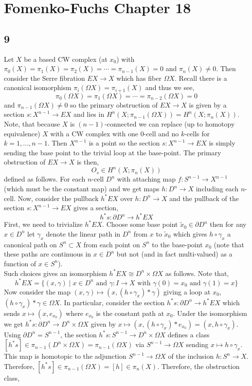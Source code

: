\documentclass[12pt]{extarticle}
\begin{document}

\section{Fomenko-Fuchs Chapter 18}

\subsection{9}

Let $X$ be a based CW complex (at $x_0$) with $\pi_0(X) = \pi_1(X) = \pi_2(X) = \cdots = \pi_{n-1}(X) = 0$ and $\pi_n(X) \neq 0$. Then consider the Serre fibration $E X \to X$ which has fiber $\Omega X$. Recall there is a canonical isomorphism $\pi_{i}(\Omega X) = \pi_{i + 1}(X)$ and thus we see,
\[ \pi_0(\Omega X) = \pi_1(\Omega X) = \cdots = \pi_{n-2}(\Omega X) = 0 \]
and $\pi_{n-1}(\Omega X) \neq 0$ so the primary obstruction of $EX \to X$ is given by a section $s : X^{n-1} \to EX$ and lies in $H^n(X; \pi_{n-1}(\Omega X)) = H^n(X; \pi_n(X))$. Note, that because $X$ is $(n-1)$-connected we can replace (up to homotopy equivalence) $X$ with a CW complex with one $0$-cell and no $k$-cells for $k = 1, \dots, n-1$. Then $X^{n-1}$ is a point so the section $s : X^{n-1} \to EX$ is simply sending the base point to the trivial loop at the base-point. The primary obstruction of $EX \to X$ is then,
\[ O_s \in H^n(X; \pi_n(X)) \]
defined as follows. For each $n$-cell $D^n$ with attaching map $f : S^{n-1} \to X^{n-1}$ (which must be the constant map) and we get maps $h : D^n \to X$ including each $n$-cell. Now, consider the pullback $h^* E X$ over $h : D^n \to X$ and the pullback of the section $s : X^{n-1} \to E X$ gives a section,
\[ h^* s : \partial D^n \to h^* EX \]
First, we need to trivialize $h^* EX$. Choose some base point $\tilde{x}_0 \in \partial D^n$ then for any $x \in D^n$ let $\gamma_x$ denote the linear path in $D^n$ from $x$ to $\tilde{x}_0$ which gives $h \circ \gamma_x$ a canonical path on $S^n \subset X$ from each point on $S^n$ to the base-point $x_0$ (note that these paths are continuous in $x \in D^n$ but not (and in fact multi-valued) as a function of $x \in S^n$).
\bigskip\\
Such choices gives an isomorphism $h^* EX \cong D^n \times \Omega X$ as follows. Note that,
\[ h^* EX = \{ (x, \gamma) \mid x \in D^n \text{ and } \gamma : I \to X \text{ with } \gamma(0) = x_0 \text{ and } \gamma(1) = x \} \]
Now consider the map $(x, \gamma) \mapsto (x, (h \circ \gamma_x) * \gamma)$ giving a loop at $x_0$, $(h \circ \gamma_x) * \gamma \in \Omega X$. In particular, consider the section $h^* s : \partial D^n \to h^* E X$ which sends $x \mapsto (x, e_{x_0})$ where $e_{x_0}$ is the constant path at $x_0$. Under the isomorphism we get $h^* s : \partial D^n \to D^n \times \Omega X$ given by $x \mapsto (x, (h \circ \gamma_x) * e_{x_0}) = (x, h \circ \gamma_x)$. Using $\partial D^n = S^{n-1}$, the section $h^* s : S^{n-1} \to D^n \times \Omega X$ defines a class $[h^* s] \in \pi_{n-1}(D^n \times \Omega X) = \pi_{n-1}(\Omega X)$ via $S^{n-1} \to \Omega X$ sending $x \mapsto h \circ \gamma_x$. This map is homotopic to the adjunction $S^{n-1} \to \Omega X$ of the inclusion $h : S^n \to X$. Therefore, $[h^* s] \in \pi_{n-1}(\Omega X) = [h] \in \pi_n(X)$. Therefore, the obstruction class,
\end{document}

